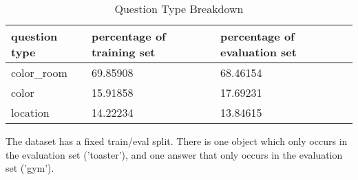 \begin{table}[h]
\centering
\caption{Question Type Breakdown}
\begin{tabular}{ |l|l|l| }
\hline
\textbf{question type} & \textbf{percentage of training set} & \textbf{percentage of evaluation set} \\
\hline
color\_room & 69.85908 & 68.46154\\
color & 15.91858 & 17.69231\\
location & 14.22234 & 13.84615\\
\hline
\end{tabular}
\label{tab:q_breakdown}
\end{table}

The dataset has a fixed train/eval split. There is one object which only occurs in the evaluation set ('toaster'), and one answer that only occurs in the evaluation set ('gym'). 





